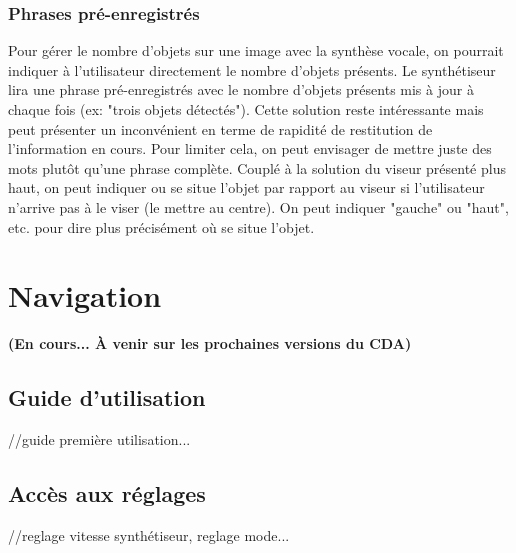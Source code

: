\documentclass[UTF8]{EPURapport}
\begin{document}
\subsubsection{Phrases pré-enregistrés}
Pour gérer le nombre d'objets sur une image avec la synthèse vocale, on pourrait indiquer à l'utilisateur directement le nombre d'objets présents. Le synthétiseur lira une phrase pré-enregistrés avec le nombre d'objets présents mis à jour à chaque fois (ex: "trois objets détectés"). Cette solution reste intéressante mais peut présenter un inconvénient en terme de rapidité de restitution de l'information en cours. Pour limiter cela, on peut envisager de mettre juste des mots plutôt qu'une phrase complète. Couplé à la solution du viseur présenté plus haut, on peut indiquer ou se situe l'objet par rapport au viseur si l'utilisateur n'arrive pas à le viser (le mettre au centre). On peut indiquer "gauche" ou "haut", etc. pour dire plus précisément où se situe l'objet.

\section{Navigation}
\textbf{(En cours... À venir sur les prochaines versions du CDA)}
\subsection{Guide d'utilisation}
//guide première utilisation...
\subsection{Accès aux réglages}
//reglage vitesse synthétiseur, reglage mode...

\annexes
\end{document}

